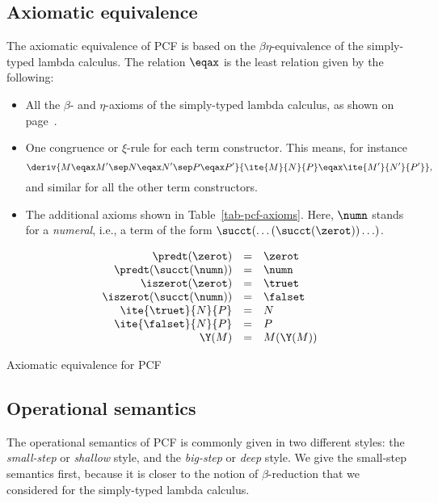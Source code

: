 \documentclass[12pt]{article}
\begin{document}
\subsection{Axiomatic equivalence}

The axiomatic equivalence of PCF is based on the
$\beta\eta$-equivalence of the simply-typed lambda calculus. The
relation $\eqax$ is the least relation given by the following:
\begin{itemize}
\item All the $\beta$- and $\eta$-axioms of the simply-typed lambda
  calculus, as shown on page~\pageref{page-typed-reductions}.
\item One congruence or $\xi$-rule for each term constructor. This
  means, for instance
  \[ \deriv {M\eqax M' \sep N\eqax N' \sep P\eqax P'}
  {\ite{M}{N}{P} \eqax \ite{M'}{N'}{P'}},
  \]
  and similar for all the other term constructors.
\item The additional axioms shown in Table~\ref{tab-pcf-axioms}. Here,
  $\numn$ stands for a {\em numeral}, i.e., a term of the form
  $\succt(\ldots(\succt(\zerot))\ldots)$.
\end{itemize}
\begin{table*}[tbp]
\[ \begin{array}{rcl}
  \predt(\zerot) &=& \zerot \\
  \predt(\succt(\numn)) &=& \numn \\
  \iszerot(\zerot) &=& \truet \\
  \iszerot(\succt(\numn)) &=& \falset \\
  \ite{\truet}{N}{P} &=& N \\
  \ite{\falset}{N}{P} &=& P \\
  \Y(M) &=& M(\Y(M))
\end{array}
\]
\caption{Axiomatic equivalence for PCF}
\label{tab-pcf-axioms}
\end{table*}

\subsection{Operational semantics}

The operational semantics of PCF is commonly given in two different
styles: the {\em small-step} or {\em shallow} style, and the {\em
  big-step} or {\em deep} style. We give the small-step semantics
first, because it is closer to the notion of $\beta$-reduction that
we considered for the simply-typed lambda calculus.
\end{document}
